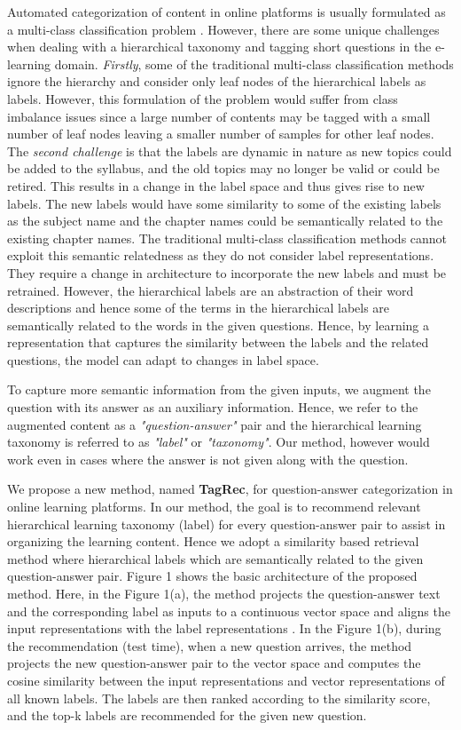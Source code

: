 \documentclass[runningheads, envcountsame, a4paper]{llncs}
\begin{document}
Automated categorization of content in online platforms is usually formulated as a multi-class classification problem \cite{xumulti,kozareva2015everyone}. However, there are some unique challenges when dealing with a hierarchical taxonomy and tagging short questions in the e-learning domain. \textit{Firstly}, some of the traditional multi-class classification methods ignore the hierarchy and consider only leaf nodes of the hierarchical labels as labels. However, this formulation of the problem would suffer from class imbalance issues since a large number of contents may be tagged with a small number of leaf nodes leaving a smaller number of samples for other leaf nodes. The \textit{second challenge} is that the labels are dynamic in nature as new topics could be added to the syllabus, and the old topics may no longer be valid or could be retired. This results in a change in the label space and thus gives rise to new labels. The new labels would have some similarity to some of the existing labels as the subject name and the chapter names could be semantically related to the existing chapter names. The traditional multi-class classification methods cannot exploit this semantic relatedness as they do not consider label representations. They require a change in architecture to incorporate the new labels and must be retrained. However, the hierarchical labels are an abstraction of their word descriptions and hence some of the terms in the hierarchical labels are semantically related to the words in the given questions. Hence, by learning a representation that captures the similarity between the labels and the related questions, the model can adapt to changes in label space.

To capture more semantic information from the given inputs, we augment the question with its answer as an auxiliary information. Hence, we refer to the augmented content as a \textit{"question-answer"} pair and the hierarchical learning taxonomy is referred to as \textit{"label"} or \textit{"taxonomy"}. Our method, however would work even in cases where the answer is not given along with the question.



We propose a new method, named \textbf{TagRec}, for question-answer categorization in online learning platforms. In our method, the goal is to recommend relevant hierarchical learning taxonomy (label) for every question-answer pair to assist in organizing the learning content. Hence we adopt a similarity based retrieval method where hierarchical labels which are semantically related to the given question-answer pair. Figure 1 shows the basic architecture of the proposed method. Here, in the Figure 1(a), the method projects the  question-answer text and the corresponding label as inputs to a continuous vector space and aligns the input representations  with the label representations . In the Figure 1(b), during the recommendation (test time), when a new question arrives, the method projects the new question-answer pair to the vector space and computes the cosine similarity between the input representations and vector representations of all known labels. The labels are then ranked according to the similarity score, and the top-k labels are recommended for the given new question.
\end{document}
